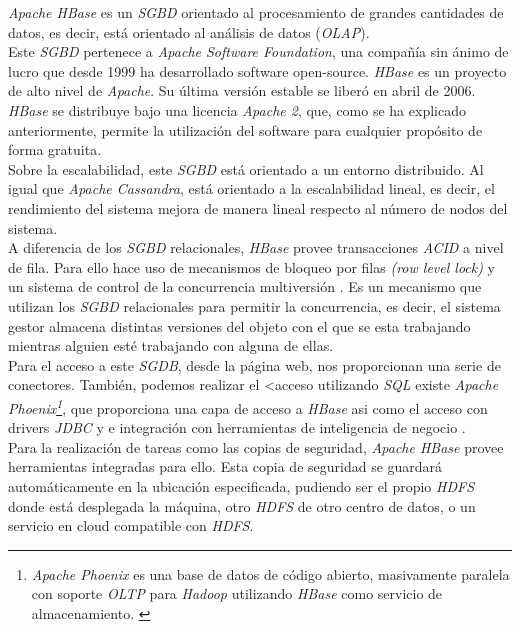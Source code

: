 \documentclass[10pt]{article}
\begin{document}
\emph{Apache HBase} es un \emph{SGBD} orientado al procesamiento de grandes cantidades de datos, es decir, está orientado al análisis de datos (\emph{OLAP}).\\

Este \emph{SGBD} pertenece a \emph{Apache Software Foundation}, una compañía sin ánimo de lucro que desde 1999 ha desarrollado software open-source. \emph{HBase} es un proyecto de alto nivel de \emph{Apache}. Su última versión estable se liberó en abril de 2006. \cite{WIKI:8} \\

\emph{HBase} se distribuye bajo una licencia \emph{Apache 2}, que, como se ha explicado anteriormente, permite la utilización del software para cualquier propósito de forma gratuita. \cite{WIKI:6}\\

Sobre la escalabilidad, este \emph{SGBD} está orientado a un entorno distribuido. Al igual que \emph{Apache Cassandra}, está orientado a la escalabilidad lineal, es decir, el rendimiento del sistema mejora de manera lineal respecto al número de nodos del sistema. \cite{AP:7} \\

A diferencia de los \emph{SGBD} relacionales, \emph{HBase} provee transacciones \emph{ACID} a nivel de fila. Para ello hace uso de mecanismos de bloqueo por filas \emph{(row level lock)} y un sistema de control de la concurrencia multiversión \cite{BAP:1}\cite{QL:1}. Es un mecanismo que utilizan los \emph{SGBD} relacionales para permitir la concurrencia, es decir, el sistema gestor almacena distintas versiones del objeto con el que se esta trabajando mientras alguien esté trabajando con alguna de ellas. \cite{WIKI:12} \\

Para el acceso a este \emph{SGDB}, desde la página web, nos proporcionan una serie de conectores. También, podemos realizar el <acceso utilizando \emph{SQL} existe \emph{Apache Phoenix\footnote{\emph{Apache Phoenix} es una base de datos de código abierto, masivamente paralela con soporte \emph{OLTP} para \emph{Hadoop} utilizando \emph{HBase} como servicio de almacenamiento. \cite{WIKI:11}}}, que proporciona una capa de acceso a \emph{HBase} asi como el acceso con drivers \emph{JDBC} y e integración con herramientas de inteligencia de negocio \cite{WIKI:8}. \\
Para la realización de tareas como las copias de seguridad, \emph{Apache HBase} provee herramientas integradas para ello. Esta copia de seguridad se guardará automáticamente en la ubicación especificada, pudiendo ser el propio \emph{HDFS} donde está desplegada la máquina, otro \emph{HDFS} de otro centro de datos, o un servicio en cloud compatible con \emph{HDFS}. \cite{AP:8}\\

\newpage


 
\end{document}
